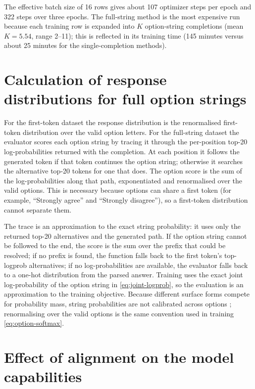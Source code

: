 The effective batch size of 16 rows gives about 107 optimizer steps per
epoch and 322 steps over three epochs. The full-string method is the most
expensive run because each training row is expanded into $K$ option-string
completions (mean $K=5.54$, range 2--11); this is reflected in its training time (145 minutes versus
about 25 minutes for the single-completion methods).

\section{Calculation of response distributions for full option strings}

For the first-token dataset the response distribution is the renormalised first-token distribution over the valid option letters. For the full-string dataset the evaluator scores each option string by tracing it through the per-position top-20 log-probabilities returned with the completion. At each position it follows the generated token if that token continues the option string; otherwise it searches the alternative top-20 tokens for one that does. The option score is the sum of the log-probabilities along that path, exponentiated and renormalised over the valid options. This is necessary because options can share a first token (for example, ``Strongly agree'' and ``Strongly disagree''), so a first-token distribution cannot separate them.

The trace is an approximation to the exact string probability: it uses only the returned top-20 alternatives and the generated path. If the option string cannot be followed to the end, the score is the sum over the prefix that could be resolved; if no prefix is found, the function falls back to the first token's top-logprob alternatives; if no log-probabilities are available, the evaluator falls back to a one-hot distribution from the parsed answer. Training uses the exact joint log-probability of the option string in \eqref{eq:joint-logprob}, so the evaluation is an approximation to the training objective. Because different surface forms compete for probability mass, string probabilities are not calibrated across options \cite{holtzmanSurfaceFormCompetition2021}; renormalising over the valid options is the same convention used in training \eqref{eq:option-softmax}.

\section{Effect of alignment on the model capabilities}
\label{sec:capability-testing}

